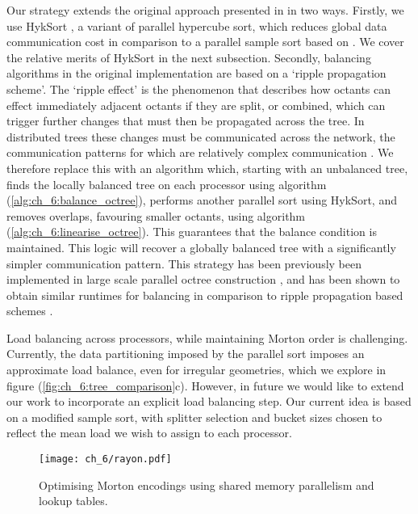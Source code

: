 Our strategy extends the original approach presented in \cite{sundar2008bottom} in two ways. Firstly, we use HykSort \cite{sundar2013hyksort}, a variant of parallel hypercube sort, which reduces global data communication cost in comparison to a parallel sample sort based on . We cover the relative merits of HykSort in the next subsection. Secondly, balancing algorithms in the original implementation are based on a `ripple propagation scheme'. The `ripple effect' is the phenomenon that describes how octants can effect immediately adjacent octants if they are split, or combined, which can trigger further changes that must then be propagated across the tree. In distributed trees these changes must be communicated across the network, the communication patterns for which are relatively complex communication \cite{tu2005scalable,sundar2008bottom}. We therefore replace this with an algorithm which, starting with an unbalanced tree, finds the locally balanced tree on each processor using algorithm (\ref{alg:ch_6:balance_octree}), performs another parallel sort using HykSort, and removes overlaps, favouring smaller octants, using algorithm (\ref{alg:ch_6:linearise_octree}). This guarantees that the balance condition is maintained. This logic will recover a globally balanced tree with a significantly simpler communication pattern. This strategy has been previously been implemented in large scale parallel octree construction \cite{malhotra2015pvfmm}, and has been shown to obtain similar runtimes for balancing in comparison to ripple propagation based schemes \cite{suh2020evaluation}.

Load balancing across processors, while maintaining Morton order is challenging. Currently, the data partitioning imposed by the parallel sort imposes an approximate load balance, even for irregular geometries, which we explore in figure (\ref{fig:ch_6:tree_comparison}c). However, in future we would like to extend our work to incorporate an explicit load balancing step. Our current idea is based on a modified sample sort, with splitter selection and bucket sizes chosen to reflect the mean load we wish to assign to each processor.

\begin{figure}
    \centerline{\texttt{[image: ch\_6/rayon.pdf]}}
    \caption{Optimising Morton encodings using shared memory parallelism and lookup tables.}
    \label{fig:ch_6:rayon}
\end{figure}

